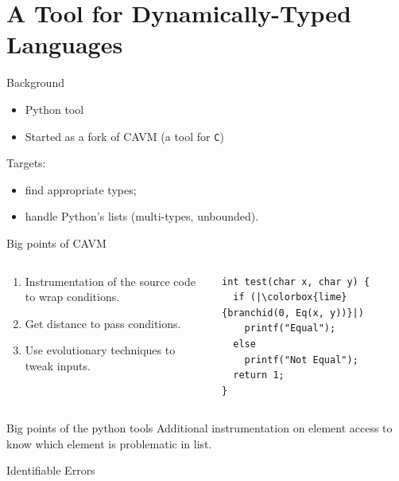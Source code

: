 \documentclass{beamer}
\begin{document}
\section{A Tool for Dynamically-Typed Languages}

\begin{frame}{Background}
  \begin{itemize}
    \item Python tool
    \item Started as a fork of CAVM (a tool for \texttt{C})
  \end{itemize}

  Targets:
  \begin{itemize}
    \item find appropriate types;
    \item handle Python's lists (multi-types, unbounded).
  \end{itemize}
\end{frame}

\begin{frame}[fragile]{Big points of CAVM}
  \begin{columns}
    \begin{column}{0.5\textwidth}
      \begin{enumerate}
        \item Instrumentation of the source code to wrap conditions.
        \item Get distance to pass conditions.
        \item Use evolutionary techniques to tweak inputs.
      \end{enumerate}
    \end{column}
    \begin{column}{0.5\textwidth}
      \begin{verbatim}
int test(char x, char y) {
  if (|\colorbox{lime}{branchid(0, Eq(x, y))}|)
    printf("Equal");
  else
    printf("Not Equal");
  return 1;
}
      \end{verbatim}
    \end{column}
  \end{columns}
\end{frame}

\begin{frame}{Big points of the python tools}
  Additional instrumentation on element access to know which element is problematic in list.
\end{frame}

\begin{frame}{Identifiable Errors}

\end{frame}
\end{document}

